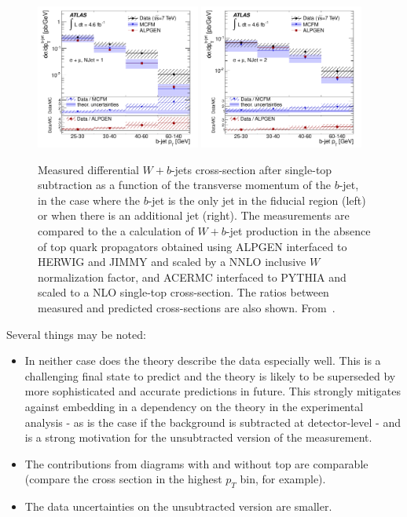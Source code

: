 \documentclass[11pt]{cernrep}
\begin{document}
\begin{figure}
\centering
	\includegraphics[width=0.48\textwidth]{fig_08a.pdf}
	\includegraphics[width=0.48\textwidth]{fig_08b.pdf}
\caption{\label{fig:notop}
Measured differential $W+b$-jets cross-section after single-top subtraction as a function of the transverse momentum of the $b$-jet, in the case where the $b$-jet is the only jet in the fiducial region (left) or when there is an additional jet (right). 
The measurements are compared to the a calculation of $W+b$-jet production in the absence of top quark propagators obtained using ALPGEN interfaced to HERWIG and JIMMY and scaled by a NNLO inclusive $W$ normalization factor, and ACERMC interfaced to PYTHIA and scaled to a NLO single-top cross-section. 
The ratios between measured and predicted cross-sections are also shown. From~\protect\cite{Aad:2013vka}.}
\end{figure}

Several things may be noted:
\begin{itemize}
\item In neither case does the theory describe the data especially well. This is a challenging
final state to predict and the theory is likely to be superseded by more sophisticated and 
accurate predictions in future. This strongly mitigates against embedding in a dependency 
on the theory in the experimental analysis - as is the case if the background is subtracted at detector-level - 
and is a strong motivation for the unsubtracted version of the measurement.
\item The contributions from diagrams with and without top are comparable (compare the cross section in the highest $p_T$ bin, 
for example).
\item The data uncertainties on the unsubtracted version are smaller.
\end{itemize}
\end{document}
